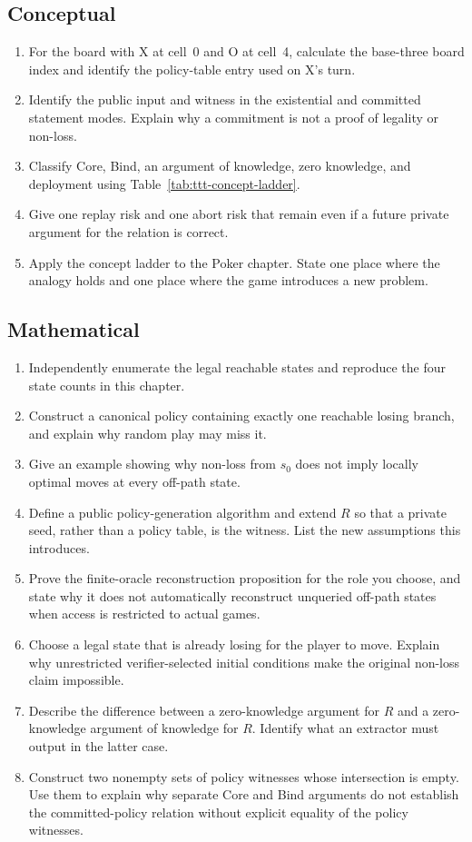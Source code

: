 \subsection*{Conceptual}
\begin{enumerate}
    \item For the board with X at cell~0 and O at cell~4, calculate the
    base-three board index and identify the policy-table entry used on X's
    turn.
    \item Identify the public input and witness in the existential and
    committed statement modes. Explain why a commitment is not a proof of
    legality or non-loss.
    \item Classify Core, Bind, an argument of knowledge, zero knowledge, and
    deployment using Table~\ref{tab:ttt-concept-ladder}.
    \item Give one replay risk and one abort risk that remain even if a future
    private argument for the relation is correct.
    \item Apply the concept ladder to the Poker chapter. State one place where
    the analogy holds and one place where the game introduces a new problem.
\end{enumerate}

\subsection*{Mathematical}
\begin{enumerate}
    \item Independently enumerate the legal reachable states and reproduce the
    four state counts in this chapter.
    \item Construct a canonical policy containing exactly one reachable losing
    branch, and explain why random play may miss it.
    \item Give an example showing why non-loss from $s_0$ does not imply
    locally optimal moves at every off-path state.
    \item Define a public policy-generation algorithm and extend $R$ so that
    a private seed, rather than a policy table, is the witness. List the new
    assumptions this introduces.
    \item Prove the finite-oracle reconstruction proposition for the role you
    choose, and state why it does not automatically reconstruct unqueried
    off-path states when access is restricted to actual games.
    \item Choose a legal state that is already losing for the player to move.
    Explain why unrestricted verifier-selected initial conditions make the
    original non-loss claim impossible.
    \item Describe the difference between a zero-knowledge argument for $R$
    and a zero-knowledge argument of knowledge for $R$. Identify what an
    extractor must output in the latter case.
    \item Construct two nonempty sets of policy witnesses whose intersection
    is empty. Use them to explain why separate Core and Bind arguments do not
    establish the committed-policy relation without explicit equality of the
    policy witnesses.
\end{enumerate}


